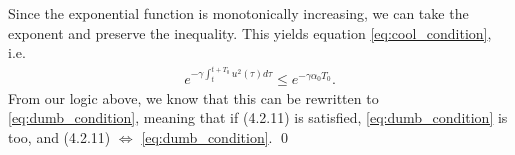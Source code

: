 \documentclass[]{article}
\begin{document}
Since the exponential function is monotonically increasing, we can take the exponent and preserve the inequality. This yields equation \eqref{eq:cool_condition}, i.e.
\begin{equation*}\begin{aligned}
e^{-\gamma \int^{t+T_0}_{t}u^2(\tau)d \tau} \leq e^{-\gamma \alpha_0 T_0}.
\end{aligned}\end{equation*}
From our logic above, we know that this can be rewritten to \eqref{eq:dumb_condition}, meaning that if (4.2.11) is satisfied, \eqref{eq:dumb_condition} is too, and (4.2.11) $\iff$ \eqref{eq:dumb_condition}. \qed
\end{document}
